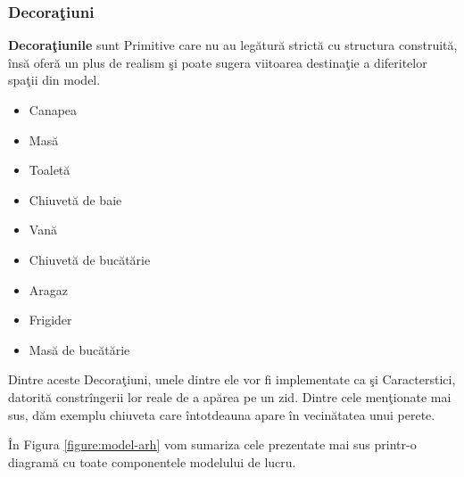 \subsubsection{Decoraţiuni}
  
\begin{definition}
\label{define:decoration}
\textbf{Decoraţiunile} sunt Primitive care nu au legătură strictă cu structura 
construită, însă oferă un plus de realism şi poate sugera viitoarea destinaţie 
a diferitelor spaţii din model.
\end{definition}
  
\begin{itemize}
  \item Canapea
  \item Masă
  \item Toaletă
  \item Chiuvetă de baie
  \item Vană
  \item Chiuvetă de bucătărie
  \item Aragaz
  \item Frigider
  \item Masă de bucătărie
\end{itemize}

Dintre aceste Decoraţiuni, unele dintre ele vor fi implementate ca şi 
Caracterstici, datorită constrîngerii lor reale de a apărea pe un zid. Dintre 
cele menţionate mai sus, dăm exemplu chiuveta care întotdeauna apare în 
vecinătatea unui perete.

În Figura \ref{figure:model-arh} vom sumariza cele prezentate mai sus printr-o 
diagramă cu toate componentele modelului de lucru.

